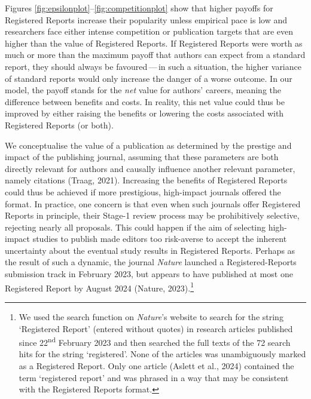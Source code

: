 \documentclass[
  ,man,mask,floatsintext]{apa6}
\begin{document}
Figures \ref{fig:epsilonplot}--\ref{fig:competitionplot} show that higher payoffs for Registered Reports increase their popularity unless empirical pace is low and researchers face either intense competition or publication targets that are even higher than the value of Registered Reports.
If Registered Reports were worth as much or more than the maximum payoff that authors can expect from a standard report, they should always be favoured\(\,\)---\(\,\)in such a situation, the higher variance of standard reports would only increase the danger of a worse outcome.
In our model, the payoff stands for the \emph{net} value for authors' careers, meaning the difference between benefits and costs.
In reality, this net value could thus be improved by either raising the benefits or lowering the costs associated with Registered Reports (or both).

We conceptualise the value of a publication as determined by the prestige and impact of the publishing journal, assuming that these parameters are both directly relevant for authors and causally influence another relevant parameter, namely citations (Traag, 2021).
Increasing the benefits of Registered Reports could thus be achieved if more prestigious, high-impact journals offered the format.
In practice, one concern is that even when such journals offer Registered Reports in principle, their Stage-1 review process may be prohibitively selective, rejecting nearly all proposals.
This could happen if the aim of selecting high-impact studies to publish made editors too risk-averse to accept the inherent uncertainty about the eventual study results in Registered Reports.
Perhaps as the result of such a dynamic, the journal \emph{Nature} launched a Registered-Reports submission track in February 2023, but appears to have published at most one Registered Report by August 2024 (Nature, 2023).\footnote{We used the search function on \emph{Nature}'s website to search for the string `Registered Report' (entered without quotes) in research articles published since 22\textsuperscript{nd} February 2023 and then searched the full texts of the 72 search hits for the string `registered'. None of the articles was unambiguously marked as a Registered Report. Only one article (Aslett et al., 2024) contained the term `registered report' and was phrased in a way that may be consistent with the Registered Reports format.}
\end{document}
